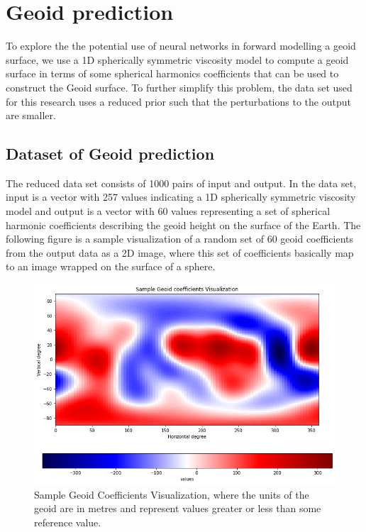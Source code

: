\chapter{Geoid prediction}\label{chap:content}

To explore the the potential use of neural networks in forward modelling a geoid surface, we use a 1D spherically symmetric viscosity model to compute a geoid surface in terms of some spherical harmonics coefficients that can be used to construct the Geoid surface. To further simplify this problem, the data set used for this research uses a reduced
prior such that the perturbations to the output are smaller.


\section{Dataset of Geoid prediction}

The reduced data set consists of 1000 pairs of input and output. In the data set, input is a vector with 257 values indicating a 1D spherically symmetric viscosity model and output is a vector with 60 values representing a set of spherical harmonic coefficients describing the geoid height on the surface of the Earth. The following figure is a sample visualization of a random set of 60 geoid coefficients from the output data as a 2D image, where this set of coefficients basically map to an image wrapped on the surface of a sphere.

\begin{figure}[H]
    \caption{Sample Geoid Coefficients Visualization,  where the units of the geoid are in metres and 
     represent values greater or less than some reference value.}
    \includegraphics[scale=0.6]{figures/geoid_images/Geoid_Sample_visualization.png}
\end{figure}

